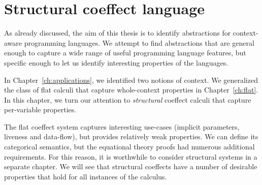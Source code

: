 
\chapter{Structural coeffect language} 
\label{ch:structural}

As already discussed, the aim of this thesis is to identify abstractions for context-aware
programming languages. We attempt to find abstractions that are general enough to capture a wide
range of useful programming language features, but specific enough to let us identify
interesting properties of the languages.

In Chapter~\ref{ch:applications}, we identified two notions of context. We generalized the 
class of flat calculi that capture whole-context properties in Chapter~\ref{ch:flat}. 
In this chapter, we turn our attention to \emph{structural} coeffect calculi that capture
per-variable properties.

The flat coeffect system captures interesting use-cases (implicit parameters, liveness and
data-flow), but provides relatively weak properties. We can define its categorical semantics,
but the equational theory proofs had numerous additional requirements. For this reason, it
is worthwhile to consider structural systems in a separate chapter. We will see that 
structural coeffects have a number of desirable properties that hold for all instances of the
calculus.



%                                                                                      
%                                                                                     

